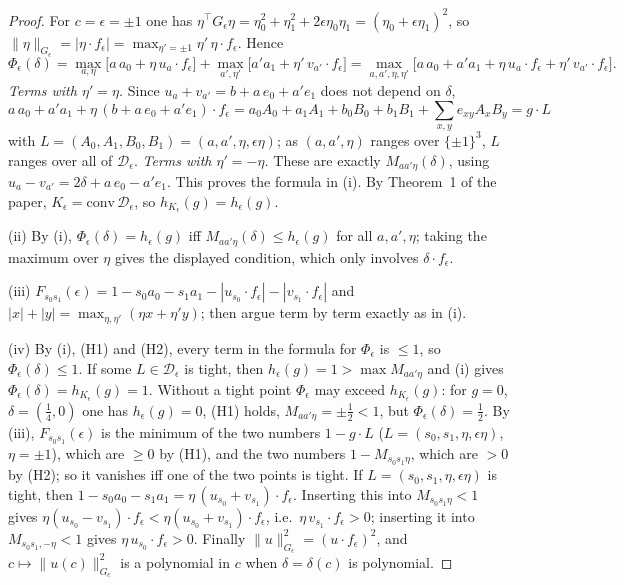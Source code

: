 \documentclass[11pt]{article}
\begin{document}
\begin{proof}
For $c=\epsilon=\pm1$ one has $\eta^\top G_\epsilon\eta=\eta_0^2+\eta_1^2+2\epsilon\eta_0\eta_1=(\eta_0+\epsilon\eta_1)^2$,
so $\|\eta\|_{G_\epsilon}=|\eta\cdot f_\epsilon|=\max_{\eta'=\pm1}\eta'\,\eta\cdot f_\epsilon$. Hence
\[
\Phi_\epsilon(\delta)=\max_{a,\eta}\bigl[a\,a_0+\eta\,u_a\cdot f_\epsilon\bigr]+\max_{a',\eta'}\bigl[a'a_1+\eta'\,v_{a'}\cdot f_\epsilon\bigr]
=\max_{a,a',\eta,\eta'}\bigl[a\,a_0+a'a_1+\eta\,u_a\cdot f_\epsilon+\eta'\,v_{a'}\cdot f_\epsilon\bigr].
\]
\emph{Terms with $\eta'=\eta$.} Since $u_a+v_{a'}=b+a\,e_0+a'e_1$ does not depend on $\delta$,
\[
a\,a_0+a'a_1+\eta\,(b+a\,e_0+a'e_1)\cdot f_\epsilon
=a_0A_0+a_1A_1+b_0B_0+b_1B_1+\sum_{x,y}e_{xy}A_xB_y=g\cdot L
\]
with $L=(A_0,A_1,B_0,B_1)=(a,a',\eta,\epsilon\eta)$; as $(a,a',\eta)$ ranges over $\{\pm1\}^3$, $L$ ranges over all of $\mathcal D_\epsilon$.
\emph{Terms with $\eta'=-\eta$.} These are exactly $M_{aa'\eta}(\delta)$, using $u_a-v_{a'}=2\delta+a\,e_0-a'e_1$.
This proves the formula in (i). By Theorem~1 of the paper, $K_\epsilon=\mathrm{conv}\,\mathcal D_\epsilon$, so
$h_{K_\epsilon}(g)=h_\epsilon(g)$.

(ii) By (i), $\Phi_\epsilon(\delta)=h_\epsilon(g)$ iff $M_{aa'\eta}(\delta)\le h_\epsilon(g)$ for all $a,a',\eta$;
taking the maximum over $\eta$ gives the displayed condition, which only involves $\delta\cdot f_\epsilon$.

(iii) $F_{s_0s_1}(\epsilon)=1-s_0a_0-s_1a_1-|u_{s_0}\cdot f_\epsilon|-|v_{s_1}\cdot f_\epsilon|$ and
$|x|+|y|=\max_{\eta,\eta'}(\eta x+\eta' y)$; then argue term by term exactly as in (i).

(iv) By (i), (H1) and (H2), every term in the formula for $\Phi_\epsilon$ is $\le1$, so $\Phi_\epsilon(\delta)\le1$.
If some $L\in\mathcal D_\epsilon$ is tight, then $h_\epsilon(g)=1>\max M_{aa'\eta}$ and (i) gives $\Phi_\epsilon(\delta)=h_{K_\epsilon}(g)=1$.
Without a tight point $\Phi_\epsilon$ may exceed $h_{K_\epsilon}(g)$: for $g=0$, $\delta=(\frac14,0)$ one has
$h_\epsilon(g)=0$, (H1) holds, $M_{aa'\eta}=\pm\frac12<1$, but $\Phi_\epsilon(\delta)=\frac12$. By (iii), $F_{s_0s_1}(\epsilon)$ is the minimum of
the two numbers $1-g\cdot L$ ($L=(s_0,s_1,\eta,\epsilon\eta)$, $\eta=\pm1$), which are $\ge0$ by (H1), and the
two numbers $1-M_{s_0s_1\eta}$, which are $>0$ by (H2); so it vanishes iff one of the two points is tight.
If $L=(s_0,s_1,\eta,\epsilon\eta)$ is tight, then $1-s_0a_0-s_1a_1=\eta\,(u_{s_0}+v_{s_1})\cdot f_\epsilon$. Inserting this into
$M_{s_0s_1\eta}<1$ gives $\eta(u_{s_0}-v_{s_1})\cdot f_\epsilon<\eta(u_{s_0}+v_{s_1})\cdot f_\epsilon$, i.e.\
$\eta\,v_{s_1}\cdot f_\epsilon>0$; inserting it into $M_{s_0s_1,-\eta}<1$ gives $\eta\,u_{s_0}\cdot f_\epsilon>0$.
Finally $\|u\|^2_{G_\epsilon}=(u\cdot f_\epsilon)^2$, and $c\mapsto\|u(c)\|^2_{G_c}$ is a polynomial in $c$ when $\delta=\delta(c)$ is polynomial.
\end{proof}
\end{document}
